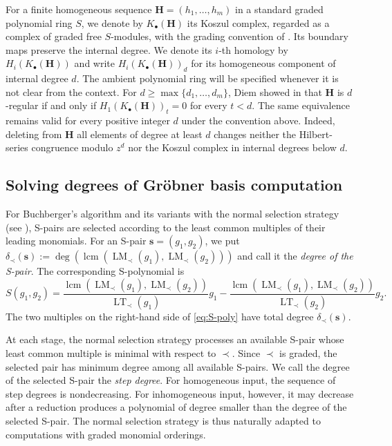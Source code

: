 \documentclass{article}
\theoremstyle{definition}
\theoremstyle{plain}
\theoremstyle{plain}
\theoremstyle{plain}
\theoremstyle{plain}
\numberwithin{equation}{subsection}
\begin{document}
For a finite homogeneous sequence $\bm H=(h_1,\ldots,h_m)$ in a standard graded polynomial ring $S$, we denote by $K_\bullet(\bm H)$ its Koszul complex, regarded as a complex of graded free $S$-modules, with the grading convention of \cite[Definition~7.6.6]{Singular}.
Its boundary maps preserve the internal degree.
We denote its $i$-th homology by $H_i(K_\bullet(\bm H))$ and write $H_i(K_\bullet(\bm H))_d$ for its homogeneous component of internal degree $d$.
The ambient polynomial ring will be specified whenever it is not clear from the context.
For $d\geq\max\{d_1,\ldots,d_m\}$, Diem showed in \cite[Theorem~1]{Diem2} that $\bm H$ is $d$-regular if and only if $H_1(K_\bullet(\bm H))_t=0$ for every $t<d$.
The same equivalence remains valid for every positive integer $d$ under the convention above.
Indeed, deleting from $\bm H$ all elements of degree at least $d$ changes neither the Hilbert-series congruence modulo $z^d$ nor the Koszul complex in internal degrees below $d$.

\subsection{Solving degrees of Gr\"{o}bner basis computation}\label{subsec:complexity}

For Buchberger's algorithm and its variants with the normal selection strategy (see \cite[Section~II.10]{CLO}), S-pairs are selected according to the least common multiples of their leading monomials.
For an S-pair $\bm{s}=(g_1,g_2)$, we put $\delta_\prec(\bm{s}):=\deg(\operatorname{lcm}(\operatorname{LM}_\prec(g_1),\operatorname{LM}_\prec(g_2)))$ and call it the \emph{degree of the S-pair}.
The corresponding S-polynomial is
\begin{equation}\label{eq:S-poly}
S(g_1,g_2)
=
\frac{
\operatorname{lcm}
(\operatorname{LM}_\prec(g_1),\operatorname{LM}_\prec(g_2))
}{
\operatorname{LT}_\prec(g_1)
}
g_1
-
\frac{
\operatorname{lcm}
(\operatorname{LM}_\prec(g_1),\operatorname{LM}_\prec(g_2))
}{
\operatorname{LT}_\prec(g_2)
}
g_2.
\end{equation}
The two multiples on the right-hand side of \eqref{eq:S-poly} have total degree $\delta_\prec(\bm{s})$.

At each stage, the normal selection strategy processes an available S-pair whose least common multiple is minimal with respect to $\prec$.
Since $\prec$ is graded, the selected pair has minimum degree among all available S-pairs.
We call the degree of the selected S-pair the \emph{step degree}.
For homogeneous input, the sequence of step degrees is nondecreasing.
For inhomogeneous input, however, it may decrease after a reduction produces a polynomial of degree smaller than the degree of the selected S-pair.
The normal selection strategy is thus naturally adapted to computations with graded monomial orderings.
\end{document}
